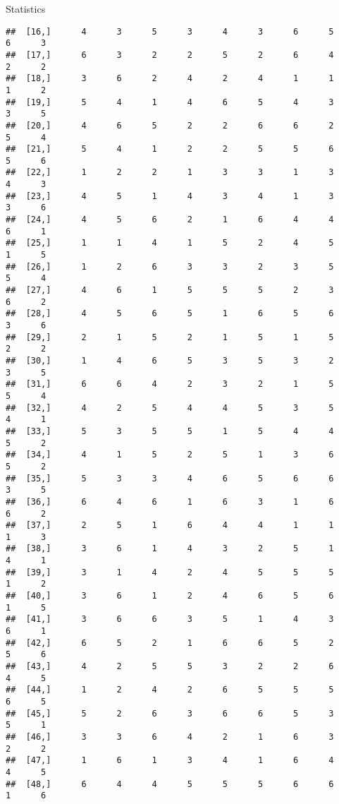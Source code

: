 \documentclass[
  ignorenonframetext,
]{beamer}
\begin{document}
\begin{frame}[fragile]{Statistics}
\begin{verbatim}
##  [16,]      4      3      5      3      4      3      6      5      6      3
##  [17,]      6      3      2      2      5      2      6      4      2      2
##  [18,]      3      6      2      4      2      4      1      1      1      2
##  [19,]      5      4      1      4      6      5      4      3      3      5
##  [20,]      4      6      5      2      2      6      6      2      5      4
##  [21,]      5      4      1      2      2      5      5      6      5      6
##  [22,]      1      2      2      1      3      3      1      3      4      3
##  [23,]      4      5      1      4      3      4      1      3      3      6
##  [24,]      4      5      6      2      1      6      4      4      6      1
##  [25,]      1      1      4      1      5      2      4      5      1      5
##  [26,]      1      2      6      3      3      2      3      5      5      4
##  [27,]      4      6      1      5      5      5      2      3      6      2
##  [28,]      4      5      6      5      1      6      5      6      3      6
##  [29,]      2      1      5      2      1      5      1      5      2      2
##  [30,]      1      4      6      5      3      5      3      2      3      5
##  [31,]      6      6      4      2      3      2      1      5      5      4
##  [32,]      4      2      5      4      4      5      3      5      4      1
##  [33,]      5      3      5      5      1      5      4      4      5      2
##  [34,]      4      1      5      2      5      1      3      6      5      2
##  [35,]      5      3      3      4      6      5      6      6      3      5
##  [36,]      6      4      6      1      6      3      1      6      6      2
##  [37,]      2      5      1      6      4      4      1      1      1      3
##  [38,]      3      6      1      4      3      2      5      1      4      1
##  [39,]      3      1      4      2      4      5      5      5      1      2
##  [40,]      3      6      1      2      4      6      5      6      1      5
##  [41,]      3      6      6      3      5      1      4      3      6      1
##  [42,]      6      5      2      1      6      6      5      2      5      6
##  [43,]      4      2      5      5      3      2      2      6      4      5
##  [44,]      1      2      4      2      6      5      5      5      6      5
##  [45,]      5      2      6      3      6      6      5      3      5      1
##  [46,]      3      3      6      4      2      1      6      3      2      2
##  [47,]      1      6      1      3      4      1      6      4      4      5
##  [48,]      6      4      4      5      5      5      6      6      1      6

\end{verbatim}
\end{frame}
\end{document}
